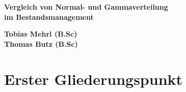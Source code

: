 \documentclass[12pt,a4paper, listof=entryprefix, bibliography=totocnumbered,toc=listofnumbered,footsepline]{scrartcl}
\newcounter{verzeichnis}
\begin{document}
\onehalfspacing	

\begin{center}

	\vspace*{4cm} %
	\Large
	\textbf{Vergleich von Normal- und Gammaverteilung}\\ %
	\large
	\textbf{im Bestandsmanagement}\\ %
		
	\vspace*{8cm} %
	\normalsize
	\begin{center}
	\date{\today}
	\textbf{Tobias Mehrl (B.Sc)}\\ %
	\textbf{Thomas Butz  (B.Sc)}
	\end{center}
\end{center}
\pagebreak

\singlespacing %
\setcounter{section}{0}
\setcounter{page}{1}

\tableofcontents %
\pagebreak

\onehalfspacing %
\renewcommand{\thesection}{\arabic{section}} %
\setcounter{page}{1}	%
\setcounter{section}{0}
\renewcommand{\sectionmark}[1]{\markright{#1}} %
\renewcommand{\subsectionmark}[1]{}            %
\renewcommand{\subsubsectionmark}[1]{}         %


\section{Erster Gliederungspunkt}
\end{document}
